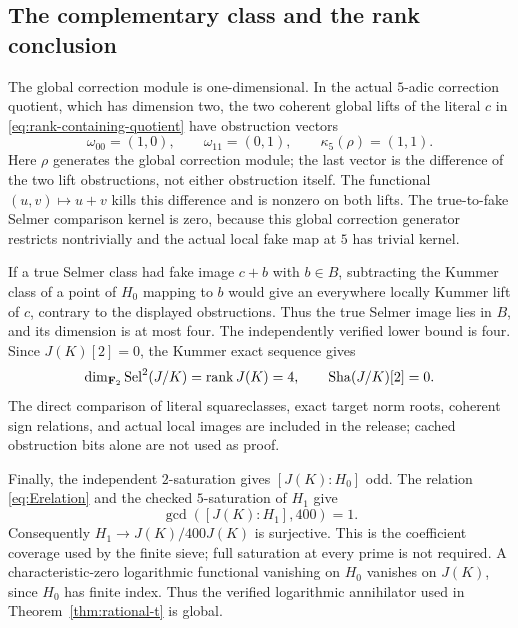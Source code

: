 \subsection{The complementary class and the rank conclusion}

The global correction module is one-dimensional.  In the actual
$5$-adic correction quotient, which has dimension two, the two coherent
global lifts of the literal $c$ in \eqref{eq:rank-containing-quotient}
have obstruction vectors
\[
 \omega_{00}=(1,0),\qquad \omega_{11}=(0,1),\qquad
                         \kappa_5(\rho)=(1,1).
\]
Here $\rho$ generates the global correction module; the last vector is
the difference of the two lift obstructions, not either obstruction
itself.  The functional $(u,v)\mapsto u+v$ kills this difference and is
nonzero on both lifts.  The true-to-fake Selmer comparison kernel is zero,
because this global correction generator restricts nontrivially and the
actual local fake map at $5$ has trivial kernel.

If a true Selmer class had fake image $c+b$ with $b\in B$, subtracting
the Kummer class of a point of $H_0$ mapping to $b$ would give an
everywhere locally Kummer lift of $c$, contrary to the displayed
obstructions.  Thus the true Selmer image lies in $B$, and its dimension
is at most four.  The independently verified lower bound is four.  Since
$J(K)[2]=0$, the Kummer exact sequence gives
\[
 \dim_{\mathbf F_2}\operatorname{Sel}^{2}(J/K)=\operatorname{rank} J(K)=4,
                      \qquad \mathop{\mathrm{Sha}}(J/K)[2]=0.
\]
The direct comparison of literal squareclasses, exact target norm roots,
coherent sign relations, and actual local images are included in the
release; cached obstruction bits alone are not used as proof.

Finally, the independent $2$-saturation gives $[J(K):H_0]$ odd.  The
relation \eqref{eq:Erelation} and the checked $5$-saturation of $H_1$
give
\[
                         \gcd([J(K):H_1],400)=1.
\]
Consequently $H_1\to J(K)/400J(K)$ is surjective.  This is the coefficient
coverage used by the finite sieve; full saturation at every prime is not
required.  A characteristic-zero logarithmic functional vanishing on
$H_0$ vanishes on $J(K)$, since $H_0$ has finite index.  Thus the verified
logarithmic annihilator used in Theorem~\ref{thm:rational-t} is global.

